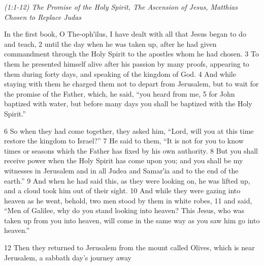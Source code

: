 \documentclass[letterpaper]{report}
\begin{document}
{\centering
	\emph{(1:1-12) The Promise of the Holy Spirit, The Ascension of Jesus, Matthias Chosen to Replace Judas}\\
}
\begin{multicols}{2}

In the first book, O The-oph′ilus, I have dealt with all that Jesus began to do and teach, 2 until the day when he was taken up, after he had given commandment through the Holy Spirit to the apostles whom he had chosen. 3 To them he presented himself alive after his passion by many proofs, appearing to them during forty days, and speaking of the kingdom of God. 4 And while staying with them he charged them not to depart from Jerusalem, but to wait for the promise of the Father, which, he said, “you heard from me, 5 for John baptized with water, but before many days you shall be baptized with the Holy Spirit.”

6 So when they had come together, they asked him, “Lord, will you at this time restore the kingdom to Israel?” 7 He said to them, “It is not for you to know times or seasons which the Father has fixed by his own authority. 8 But you shall receive power when the Holy Spirit has come upon you; and you shall be my witnesses in Jerusalem and in all Judea and Samar′ia and to the end of the earth.” 9 And when he had said this, as they were looking on, he was lifted up, and a cloud took him out of their sight. 10 And while they were gazing into heaven as he went, behold, two men stood by them in white robes, 11 and said, “Men of Galilee, why do you stand looking into heaven? This Jesus, who was taken up from you into heaven, will come in the same way as you saw him go into heaven.”

12 Then they returned to Jerusalem from the mount called Olives, which is near Jerusalem, a sabbath day’s journey away
\end{multicols}
\end{document}
